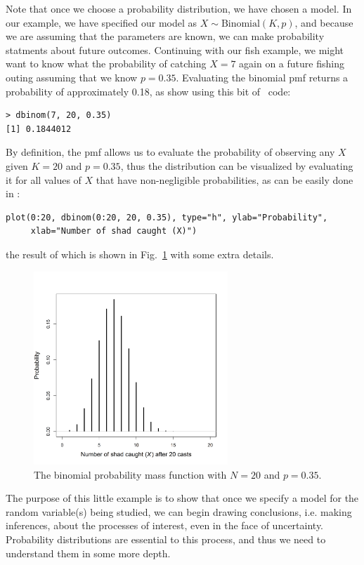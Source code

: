 Note that once we choose a probability distribution, we have chosen a
model. In our example, we have specified our model as $X \sim
\text{Binomial}(K,p)$, and because we are assuming that the parameters are
known, we can make probability statments about future
outcomes. Continuing with our fish example, we might want to know what
the probability of catching $X=7$ again on a future fishing outing
assuming that we know $p=0.35$. Evaluating the binomial pmf returns a
probability of approximately 0.18, as show using this bit of \R~code:
\begin{verbatim}
> dbinom(7, 20, 0.35)
[1] 0.1844012
\end{verbatim}
By definition, the pmf allows us to evaluate the probability of observing
any $X$ given $K=20$ and $p=0.35$, thus the distribution %
can be visualized by evaluating it for all values of $X$ that have
non-negligible probabilities, as can be easily done in \R:
\begin{verbatim}
plot(0:20, dbinom(0:20, 20, 0.35), type="h", ylab="Probability",
     xlab="Number of shad caught (X)")
\end{verbatim}
the result of which is shown in Fig.~\ref{modeling.fig.bin} with some extra details.
\begin{figure}%
  \centering
  \includegraphics[width=0.65\textwidth]{Ch1b/figs/bin}
\caption{The binomial probability mass function with $N=20$ and
  $p=0.35$. }
\label{modeling.fig.bin}
\end{figure}

The purpose of this little example is to show that once we specify a
model for the random variable(s) being studied, we can begin drawing
conclusions, i.e. making inferences, about the processes of interest,
even in the face of uncertainty. Probability distributions are
essential to this process, and thus we need to
understand them in some more depth.


